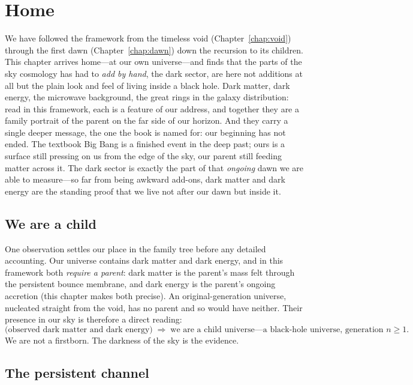 \chapter{Home}
\label{chap:home}

We have followed the framework from the timeless void (Chapter~\ref{chap:void})
through the first dawn (Chapter~\ref{chap:dawn}) down the recursion to its
children. This chapter arrives home---at our own universe---and finds that the
parts of the sky cosmology has had to \emph{add by hand}, the dark sector, are
here not additions at all but the plain look and feel of living inside a black
hole. Dark matter, dark energy, the microwave background, the great rings in the
galaxy distribution: read in this framework, each is a feature of our address, and
together they are a family portrait of the parent on the far side of our horizon.
And they carry a single deeper message, the one the book is named for: our
beginning has not ended. The textbook Big Bang is a finished event in the deep
past; ours is a surface still pressing on us from the edge of the sky, our parent
still feeding matter across it. The dark sector is exactly the part of that
\emph{ongoing} dawn we are able to measure---so far from being awkward add-ons,
dark matter and dark energy are the standing proof that we live not after our
dawn but inside it.

\section{We are a child}
\label{sec:we-are-child}

One observation settles our place in the family tree before any detailed
accounting. Our universe contains dark matter and dark energy, and in this
framework both \emph{require a parent}: dark matter is the parent's mass felt
through the persistent bounce membrane, and dark energy is the parent's ongoing
accretion (this chapter makes both precise). An original-generation universe,
nucleated straight from the void, has no parent and so would have neither. Their
presence in our sky is therefore a direct reading:
\[
  \text{(observed dark matter and dark energy)} \;\Longrightarrow\;
  \text{we are a child universe---a black-hole universe, generation } n\ge 1 .
\]
We are not a firstborn. The darkness of the sky is the evidence.

\section{The persistent channel}
\label{sec:persistent-channel}

